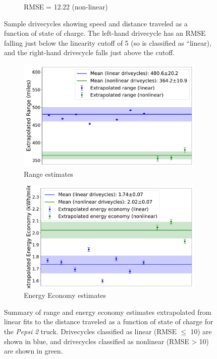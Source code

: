 \begin{figure}[H]
\begin{subfigure}[b]{0.48\textwidth}
        \caption{RMSE = 12.22 (non-linear)}
        \label{fig:distance_vs_soc_above_cutoff}
    \end{subfigure}
    \caption{Sample drivecycles showing speed and distance traveled as a function of state of charge. The left-hand drivecycle has an RMSE falling just below the linearity cutoff of 5 (so is classified as ``linear), and the right-hand drivecycle falls just above the cutoff.}
    \label{fig:distance_vs_soc_cutoff}
\end{figure}

\begin{figure}[H]
    \centering
    \begin{subfigure}[b]{0.48\textwidth}
        \centering
        \includegraphics[width=\textwidth]{figures/pepsi_2_range_summary.pdf}
        \caption{Range estimates}
        \label{fig:range_summary}
    \end{subfigure}
    \hfill
    \begin{subfigure}[b]{0.48\textwidth}
        \centering
        \includegraphics[width=\textwidth]{figures/pepsi_2_fuel_economy_summary.pdf}
        \caption{Energy Economy estimates}
        \label{fig:energy_economy_summary}
    \end{subfigure}
    \caption{Summary of range and energy economy estimates extrapolated from linear fits to the distance traveled as a function of state of charge for the \textit{Pepsi 2} truck. Drivecycles classified as linear (RMSE $\leq$ 10) are shown in blue, and drivecycles classified as nonlinear (RMSE > 10) are shown in green.}
    \label{fig:range_energy_economy_summary}
\end{figure}


